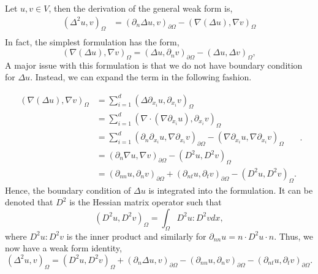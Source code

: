 Let $u,v \in  V$, then the derivation of the general weak form is,
\[
\begin{split}
\left( \Delta ^2 u,v \right) _{\Omega }  &  = \left( \partial _{n} \Delta u, v \right) _{\partial \Omega } - \left( \nabla \left( \Delta  u \right) , \nabla v \right) _{\Omega }  \\
\end{split}
\]
In fact, the simplest formulation has the form,
\[
  \left( \nabla \left( \Delta u \right) , \nabla v \right) _{\Omega } =   \left( \Delta u, \partial _{n} v \right) _{\partial \Omega } - \left( \Delta u, \Delta v \right)_{\Omega },
\]
A major issue with this formulation is that we do not have boundary condition for $\Delta u$. Instead, we can expand the term in the following fashion.

\begin{equation*}
    \begin{split}
\left( \nabla \left( \Delta u \right) , \nabla v \right) _{\Omega } & = \sum_{i = 1}^{ d}  \left( \Delta  \partial _{x_{i}} u, \partial _{x_{i}}v \right) _{\Omega }  \\
&= \sum_{i = 1}^{d}  \left( \nabla \cdot \left( \nabla \partial _{x_{i}} u \right) , \partial _{x_{i}} v \right)_{\Omega }  \\
&= \sum_{i = 1}^{d}  \left( \partial_n  \partial _{x_{i}} u, \nabla  \partial _{x_{i}} v \right) _{\partial \Omega} -   \left( \nabla \partial _{x_{i}} u, \nabla \partial _{x_{i}} v \right)_{\Omega }  \\
&= \left(  \partial_n\nabla u, \nabla v \right) _{\partial \Omega } - \left( D^2 u, D^2v \right) _{\Omega } \\
&= \left( \partial _{nn} u, \partial _{n} v  \right)_{\partial \Omega }   + \left( \partial _{nt} u, \partial _{t} v \right) _{\partial \Omega } - \left( D^2u, D^2v \right) _{\Omega } .
    \end{split}
.\end{equation*}
Hence, the boundary condition of $\Delta u$ is integrated into the formulation.  It can be denoted that $D^2$ is the Hessian matrix operator such that
$$( D^2u, D^2v )_{\Omega } = \int_{\Omega }^{} D^{2}u : D^2v  dx,$$
where $D^2u:D^2v$ is the inner product and similarly for $\partial _{nn} u = n\cdot D^2 u \cdot n$. Thus, we now have a weak form identity,
\begin{equation}
\label{eq:weak_form_identity}
\left( \Delta ^2 u, v \right) _{ \Omega } = \left( D^2u, D^2v \right) _{\Omega} +   \left( \partial _{n} \Delta u, v  \right) _{\partial \Omega }  - (\partial _{nn} u, \partial _{n} v )_{\partial \Omega } - \left( \partial _{nt} u, \partial _{t}v
\right) _{\partial \Omega }
.\end{equation}

